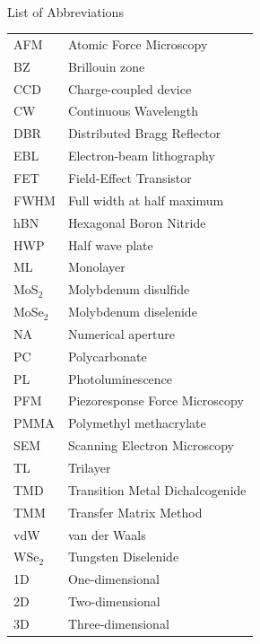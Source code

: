
\renewcommand{\baselinestretch}{1}
\small\normalsize
\hbox{\ }

\vspace{.5in}


\begin{center}
\large{List of Abbreviations}
\end{center} 

\vspace{3pt}

\begin{tabular}{ll}

AFM   &  Atomic Force Microscopy \\
BZ    & Brillouin zone \\
CCD   &  Charge-coupled device \\
CW   &  Continuous Wavelength \\
DBR   &  Distributed Bragg Reflector \\
EBL   & Electron-beam lithography \\
FET   &  Field-Effect Transistor \\
FWHM    & Full width at half maximum \\
hBN   &  Hexagonal Boron Nitride \\
HWP    & Half wave plate \\
ML    &  Monolayer \\
MoS$_2$  & Molybdenum disulfide \\
MoSe$_2$  & Molybdenum diselenide \\
NA   &  Numerical aperture \\
PC  &  Polycarbonate \\
PL    &  Photoluminescence \\
PFM   &  Piezoresponse Force Microscopy \\
PMMA  &  Polymethyl methacrylate \\
SEM   &  Scanning Electron Microscopy \\
TL    &  Trilayer \\
TMD   &  Transition Metal Dichalcogenide \\
TMM   &  Transfer Matrix Method \\
vdW   &   van der Waals \\
WSe$_2$ &  Tungsten Diselenide \\
1D &  One-dimensional \\
2D &  Two-dimensional \\
3D &  Three-dimensional \\

\end{tabular}
